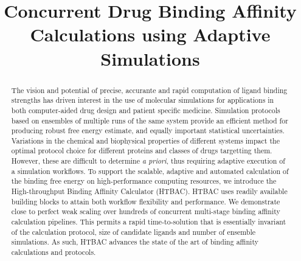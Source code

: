 \documentclass{llncs}
\title{Concurrent Drug Binding Affinity Calculations using Adaptive Simulations}
\begin{document}
\maketitle





\begin{abstract}

The vision and potential of precise, accurante and rapid computation of ligand
binding strengths has driven interest in the use of molecular simulations for
applications in both computer-aided drug design and patient specific medicine.
Simulation protocols based on ensembles of multiple runs of the same system
provide an efficient method for producing robust free energy estimate, and
equally important statistical uncertainties. Variations in the chemical and
biophysical properties of different systems impact the optimal protocol choice
for different proteins and classes of drugs targetting them. However, these
are difficult to determine {\it a priori}, thus requiring adaptive execution
of a simulation workflows. To support the scalable, adaptive and automated
calculation of the binding free energy on high-performance computing
resources, we introduce the High-throughput Binding Affinity Calculator
(HTBAC). HTBAC uses readily available building blocks to attain both workflow
flexibility and performance. We demonstrate close to perfect weak scaling over
hundreds of concurrent multi-stage binding affinity calculation pipelines.
This permits a rapid time-to-solution that is essentially invariant of the
calculation protocol, size of candidate ligands and number of ensemble
simulations. As such, HTBAC advances the state of the art of binding affinity
calculations and protocols.
\end{abstract}
\end{document}
